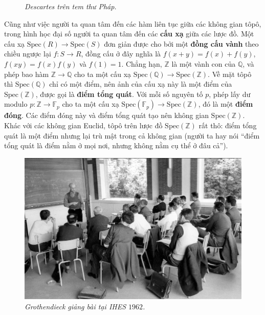 \begin{multicols}{2}
\begin{figure}[H]
		\caption{\small\textit{\color{duongvaotoanhoc}Descartes trên tem thư Pháp.}}
		\vspace*{-10pt}
	\end{figure}
	Cũng như việc người ta quan tâm đến các hàm liên tục giữa các không gian tôpô, trong hình học đại số người ta quan tâm đến các {\bf\color{duongvaotoanhoc} cấu xạ} giữa các lược đồ. Một cấu xạ $\text{Spec}(R) \to \text{Spec}(S)$ đơn giản được cho bởi một {\bf\color{duongvaotoanhoc} đồng cấu vành} theo chiều ngược lại $f: S \to R$, đồng cấu ở đây nghĩa là $f(x+y) = f(x)+f(y)$, $f(xy) = f(x)f(y)$ và $f(1) = 1$. Chẳng hạn, $\mathbb{Z}$ là một vành con của $\mathbb{Q}$, và phép bao hàm $\mathbb{Z} \to \mathbb{Q}$ cho ta một cấu xạ $\text{Spec}(\mathbb{Q}) \to \text{Spec}(\mathbb{Z})$. Về mặt tôpô thì $\text{Spec}(\mathbb{Q})$ chỉ có một điểm, nên ảnh của cấu xạ này là một điểm của $\text{Spec}(\mathbb{Z})$, được gọi là {\bf\color{duongvaotoanhoc} điểm tổng quát}. Với mỗi số nguyên tố $p$, phép lấy dư modulo $p: \mathbb{Z} \to \mathbb{F}_p$ cho ta một cấu xạ $\text{Spec}(\mathbb{F}_p) \to \text{Spec}(\mathbb{Z})$, đó là một {\bf\color{duongvaotoanhoc} điểm đóng}. Các điểm đóng này và điểm tổng quát tạo nên không gian $\text{Spec}(\mathbb{Z})$. Khác với các không gian Euclid, tôpô trên lược đồ $\text{Spec}(\mathbb{Z})$ rất thô: điểm tổng quát là một điểm nhưng lại trù mật trong cả không gian (người ta hay nói ``điểm tổng quát là điểm nằm ở mọi nơi, nhưng không nằm cụ thể ở đâu cả'').
	\begin{figure}[H]
		\vspace*{-5pt}
		\centering
		\captionsetup{labelformat= empty, justification=centering}
		\includegraphics[width= 1\linewidth]{Grothendieck}
		\caption{\small\textit{\color{duongvaotoanhoc}Grothendieck giảng bài tại IHES $1962$.}}

\end{figure}
\end{multicols}
